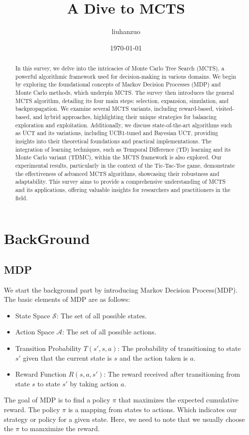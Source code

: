 \documentclass[11pt]{article}
\theoremstyle{definitionstyle}
\begin{document}
\title{A Dive to MCTS}
\author{liuhanzuo}
\date{\today}
\maketitle
\begin{abstract}
In this survey, we delve into the intricacies of Monte Carlo Tree Search (MCTS), a powerful algorithmic framework used for decision-making in various domains. We begin by exploring the foundational concepts of Markov Decision Processes (MDP) and Monte Carlo methods, which underpin MCTS. The survey then introduces the general MCTS algorithm, detailing its four main steps: selection, expansion, simulation, and backpropagation. We examine several MCTS variants, including reward-based, visited-based, and hybrid approaches, highlighting their unique strategies for balancing exploration and exploitation. Additionally, we discuss state-of-the-art algorithms such as UCT and its variations, including UCB1-tuned and Bayesian UCT, providing insights into their theoretical foundations and practical implementations. The integration of learning techniques, such as Temporal Difference (TD) learning and its Monte Carlo variant (TDMC), within the MCTS framework is also explored. Our experimental results, particularly in the context of the Tic-Tac-Toe game, demonstrate the effectiveness of advanced MCTS algorithms, showcasing their robustness and adaptability. This survey aims to provide a comprehensive understanding of MCTS and its applications, offering valuable insights for researchers and practitioners in the field.
\end{abstract}
\section{BackGround}
\subsection{MDP}
We start the background part by introducing Markov Decision Process(MDP). The basic elements of MDP are as follows:
\begin{itemize}
    \item State Space $\mathcal{S}$: The set of all possible states.
    \item Action Space $\mathcal{A}$: The set of all possible actions.
    \item Transition Probability $T(s',s,a)$: The probability of transitioning to state $s'$ given that the current state is $s$ and the action taken is $a$.
    \item Reward Function $R(s,a,s')$: The reward received after transitioning from state $s$ to state $s'$ by taking action $a$.
\end{itemize}
The goal of MDP is to find a policy $\pi$ that maximizes the expected cumulative reward. The policy $\pi$ is a mapping from states to actions. Which indicates our strategy or policy for a given state. Here, we need to note that we usually choose the $\pi$ to mamximize the reward.
\end{document}
